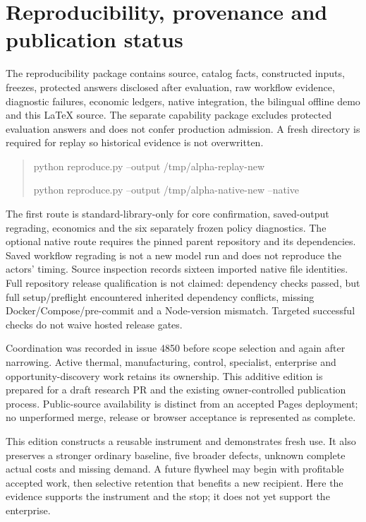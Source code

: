 \documentclass[11pt]{article}
\begin{document}
\section{Reproducibility, provenance and publication status}
The reproducibility package contains source, catalog facts, constructed inputs, freezes, protected answers disclosed after evaluation, raw workflow evidence, diagnostic failures, economic ledgers, native integration, the bilingual offline demo and this LaTeX source. The separate capability package excludes protected evaluation answers and does not confer production admission. A fresh directory is required for replay so historical evidence is not overwritten.

\begin{quote}\small\ttfamily
python reproduce.py --output /tmp/alpha-replay-new\par
python reproduce.py --output /tmp/alpha-native-new --native
\end{quote}
The first route is standard-library-only for core confirmation, saved-output regrading, economics and the six separately frozen policy diagnostics. The optional native route requires the pinned parent repository and its dependencies. Saved workflow regrading is not a new model run and does not reproduce the actors' timing. Source inspection records sixteen imported native file identities. Full repository release qualification is not claimed: dependency checks passed, but full setup/preflight encountered inherited dependency conflicts, missing Docker/Compose/pre-commit and a Node-version mismatch. Targeted successful checks do not waive hosted release gates.

Coordination was recorded in issue 4850 before scope selection and again after narrowing. Active thermal, manufacturing, control, specialist, enterprise and opportunity-discovery work retains its ownership. This additive edition is prepared for a draft research PR and the existing owner-controlled publication process. Public-source availability is distinct from an accepted Pages deployment; no unperformed merge, release or browser acceptance is represented as complete.\cite{coordination}

\begin{finding}[title=The next opportunity must earn its place]
This edition constructs a reusable instrument and demonstrates fresh use. It also preserves a stronger ordinary baseline, five broader defects, unknown complete actual costs and missing demand. A future flywheel may begin with profitable accepted work, then selective retention that benefits a new recipient. Here the evidence supports the instrument and the stop; it does not yet support the enterprise.
\end{finding}
\end{document}
